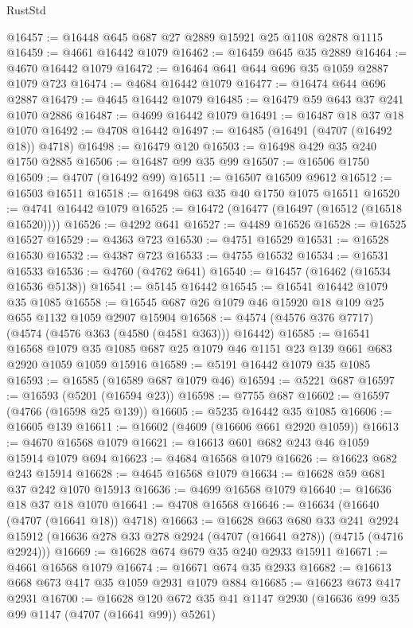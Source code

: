\begin{lexlean}{RustStd}
\begin{coremodule}
{\begin{coremodule}
{{{{{{{{{{{{{{{{{{{{{{{{{{{{{{{{{{{@16457 := @16448 @645 @687 @27 @2889 @15921 @25 @1108 @2878 @1115
@16459 := @4661 @16442 @1079
@16462 := @16459 @645 @35 @2889
@16464 := @4670 @16442 @1079
@16472 := @16464 @641 @644 @696 @35 @1059 @2887 @1079 @723
@16474 := @4684 @16442 @1079
@16477 := @16474 @644 @696 @2887
@16479 := @4645 @16442 @1079
@16485 := @16479 @59 @643 @37 @241 @1070 @2886
@16487 := @4699 @16442 @1079
@16491 := @16487 @18 @37 @18 @1070
@16492 := @4708 @16442
@16497 := @16485 (@16491 (@4707 (@16492 @18)) @4718)
@16498 := @16479 @120
@16503 := @16498 @429 @35 @240 @1750 @2885
@16506 := @16487 @99 @35 @99
@16507 := @16506 @1750
@16509 := @4707 (@16492 @99)
@16511 := @16507 @16509 @9612
@16512 := @16503 @16511
@16518 := @16498 @63 @35 @40 @1750 @1075 @16511
@16520 := @4741 @16442 @1079
@16525 := @16472 (@16477 (@16497 (@16512 (@16518 @16520))))
@16526 := @4292 @641
@16527 := @4489 @16526
@16528 := @16525 @16527
@16529 := @4363 @723
@16530 := @4751 @16529
@16531 := @16528 @16530
@16532 := @4387 @723
@16533 := @4755 @16532
@16534 := @16531 @16533
@16536 := @4760 (@4762 @641)
@16540 := @16457 (@16462 (@16534 @16536 @5138))
@16541 := @5145 @16442
@16545 := @16541 @16442 @1079 @35 @1085
@16558 := @16545 @687 @26 @1079 @46 @15920 @18 @109 @25 @655 @1132 @1059 @2907 @15904
@16568 := @4574 (@4576 @376 @7717) (@4574 (@4576 @363 (@4580 (@4581 @363))) @16442)
@16585 := @16541
    @16568
    @1079
    @35
    @1085
    @687
    @25
    @1079
    @46
    @1151
    @23
    @139
    @661
    @683
    @2920
    @1059
    @1059
    @15916
@16589 := @5191 @16442 @1079 @35 @1085
@16593 := @16585 (@16589 @687 @1079 @46)
@16594 := @5221 @687
@16597 := @16593 (@5201 (@16594 @23))
@16598 := @7755 @687
@16602 := @16597 (@4766 (@16598 @25 @139))
@16605 := @5235 @16442 @35 @1085
@16606 := @16605 @139
@16611 := @16602 (@4609 (@16606 @661 @2920 @1059))
@16613 := @4670 @16568 @1079
@16621 := @16613 @601 @682 @243 @46 @1059 @15914 @1079 @694
@16623 := @4684 @16568 @1079
@16626 := @16623 @682 @243 @15914
@16628 := @4645 @16568 @1079
@16634 := @16628 @59 @681 @37 @242 @1070 @15913
@16636 := @4699 @16568 @1079
@16640 := @16636 @18 @37 @18 @1070
@16641 := @4708 @16568
@16646 := @16634 (@16640 (@4707 (@16641 @18)) @4718)
@16663 := @16628
    @663
    @680
    @33
    @241
    @2924
    @15912
    (@16636 @278 @33 @278 @2924 (@4707 (@16641 @278)) (@4715 (@4716 @2924)))
@16669 := @16628 @674 @679 @35 @240 @2933 @15911
@16671 := @4661 @16568 @1079
@16674 := @16671 @674 @35 @2933
@16682 := @16613 @668 @673 @417 @35 @1059 @2931 @1079 @884
@16685 := @16623 @673 @417 @2931
@16700 := @16628 @120 @672 @35 @41 @1147 @2930 (@16636 @99 @35 @99 @1147 (@4707 (@16641 @99)) @5261)
}}}}}}}}}}}}}}}}}}}}}}}}}}}}}}}}}}}
\end{coremodule}}
\end{coremodule}
\end{lexlean}
